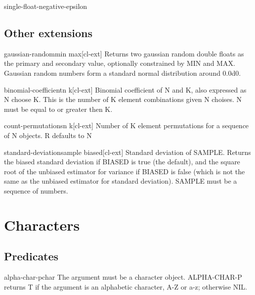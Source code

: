 \documentclass[10pt,english]{book}
\begin{document}
\begin{constant}{single-float-negative-epsilon}{}
  
\end{constant}

\section{Other extensions}
\label{sec:other-extensions}

\begin{function}{gaussian-random}{\op min max}[cl-ext]
  Returns two gaussian random double floats as the primary and secondary value,
optionally constrained by MIN and MAX. Gaussian random numbers form a standard
normal distribution around 0.0d0.
\end{function}

\begin{function}{binomial-coefficient}{n k}[cl-ext]
  Binomial coefficient of N and K, also expressed as N choose K. This is the
number of K element combinations given N choises. N must be equal to or
greater then K.
\end{function}

\begin{function}{count-permutations}{n \op k}[cl-ext]
  Number of K element permutations for a sequence of N objects.
R defaults to N
\end{function}

\begin{function}{standard-deviation}{sample \key biased}[cl-ext]
  Standard deviation of SAMPLE. Returns the biased standard deviation if
BIASED is true (the default), and the square root of the unbiased estimator
for variance if BIASED is false (which is not the same as the unbiased
estimator for standard deviation). SAMPLE must be a sequence of numbers.
\end{function}



\chapter{Characters}

\section{Predicates}
\label{sec:character-predicates}

\begin{function}{alpha-char-p}{char}
  The argument must be a character object. ALPHA-CHAR-P returns T if the
   argument is an alphabetic character, A-Z or a-z; otherwise NIL.
\end{function}
\end{document}
